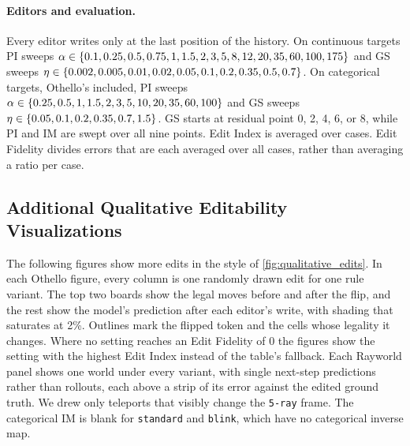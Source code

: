 \documentclass{article} %
\DeclarePairedDelimiter{\set}{\{}{\}}
\begin{document}
\paragraph{Editors and evaluation.}
Every editor writes only at the last position of the history. On continuous targets PI sweeps $\alpha \in \set{0.1, 0.25, 0.5, 0.75, 1, 1.5, 2, 3, 5, 8, 12, 20, 35, 60, 100, 175}$ and GS sweeps $\eta \in \set{0.002, 0.005, 0.01, 0.02, 0.05, 0.1, 0.2, 0.35, 0.5, 0.7}$. On categorical targets, Othello's included, PI sweeps $\alpha \in \set{0.25, 0.5, 1, 1.5, 2, 3, 5, 10, 20, 35, 60, 100}$ and GS sweeps $\eta \in \set{0.05, 0.1, 0.2, 0.35, 0.7, 1.5}$. GS starts at residual point 0, 2, 4, 6, or 8, while PI and IM are swept over all nine points. Edit Index is averaged over cases. Edit Fidelity divides errors that are each averaged over all cases, rather than averaging a ratio per case.


\FloatBarrier
\subsection{Additional Qualitative Editability Visualizations}
\label{app:additional_edit_visuals}

The following figures show more edits in the style of \cref{fig:qualitative_edits}. In each Othello figure, every column is one randomly drawn edit for one rule variant. The top two boards show the legal moves before and after the flip, and the rest show the model's prediction after each editor's write, with shading that saturates at 2\%. Outlines mark the flipped token and the cells whose legality it changes. Where no setting reaches an Edit Fidelity of $0$ the figures show the setting with the highest Edit Index instead of the table's fallback. Each Rayworld panel shows one world under every variant, with single next-step predictions rather than rollouts, each above a strip of its error against the edited ground truth. We drew only teleports that visibly change the \texttt{5-ray} frame. The categorical IM is blank for \texttt{standard} and \texttt{blink}, which have no categorical inverse map.
\end{document}
